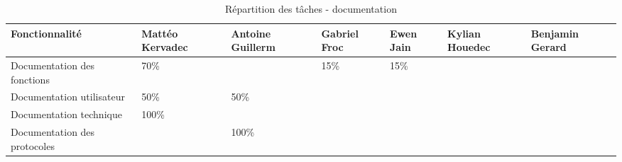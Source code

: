 \documentclass{report}
\begin{document}
\begin{table}[ht]
\hspace{-1cm}  %
\begin{tabular}{|p{3cm}|p{2cm}|p{2cm}|p{2cm}|p{2cm}|p{2cm}|p{2cm}|}
\hline
\textbf{Fonctionnalité} & \textbf{Mattéo Kervadec} & \textbf{Antoine Guillerm} & \textbf{Gabriel Froc} & \textbf{Ewen Jain} & \textbf{Kylian Houedec} & \textbf{Benjamin Gerard} \\
\hline
Documentation des fonctions & 70\% & & 15\% & 15\% & & \\
\hline
Documentation utilisateur & 50\% & 50\% & & & & \\
\hline
Documentation technique & 100\% & & & & & \\
\hline
Documentation des protocoles & & 100\% & & & & \\
\hline
\end{tabular}
\caption{Répartition des tâches - documentation}
\end{table}
\end{document}

